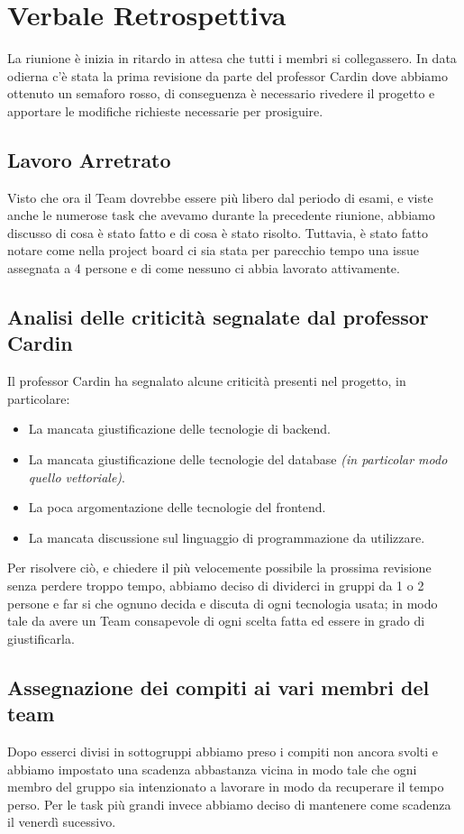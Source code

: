 \documentclass{article}
\begin{document}
\section{Verbale Retrospettiva}
La riunione è inizia in ritardo in attesa che tutti i membri si collegassero. In data odierna c'è stata la prima revisione da parte del professor Cardin dove abbiamo ottenuto un semaforo rosso, di conseguenza è necessario rivedere il progetto e apportare le modifiche richieste necessarie per prosiguire.
\subsection{Lavoro Arretrato}
Visto che ora il Team dovrebbe essere più libero dal periodo di esami, e viste anche le numerose task che avevamo durante la precedente riunione, abbiamo discusso di cosa è stato fatto e di cosa è stato risolto. Tuttavia, è stato fatto notare come nella project board ci sia stata per parecchio tempo una issue assegnata a 4 persone e di come nessuno ci abbia lavorato attivamente.
\subsection{Analisi delle criticità segnalate dal professor Cardin}
Il professor Cardin ha segnalato alcune criticità presenti nel progetto, in particolare:
\begin{itemize}
    \item La mancata giustificazione delle tecnologie di backend.
    \item La mancata giustificazione delle tecnologie del database \textit{(in particolar modo quello vettoriale)}.
    \item La poca argomentazione delle tecnologie del frontend.
    \item La mancata discussione sul linguaggio di programmazione da utilizzare.
\end{itemize}
Per risolvere ciò, e chiedere il più velocemente possibile la prossima revisione senza perdere troppo tempo, abbiamo deciso di dividerci in gruppi da 1 o 2 persone e far si che ognuno decida e discuta di ogni tecnologia usata; in modo tale da avere un Team consapevole di ogni scelta fatta ed essere in grado di giustificarla.
\subsection{Assegnazione dei compiti ai vari membri del team}
Dopo esserci divisi in sottogruppi abbiamo preso i compiti non ancora svolti e abbiamo impostato una scadenza abbastanza vicina in modo tale che ogni membro del gruppo sia intenzionato a lavorare in modo da recuperare il tempo perso. Per le task più grandi invece abbiamo deciso di mantenere come scadenza il venerdì sucessivo.
\end{document}
